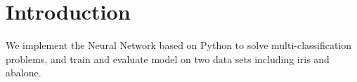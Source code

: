 \section{Introduction}
We implement the Neural Network based on Python to solve multi-classification problems, and train and evaluate model on two data sets including iris and abalone.
